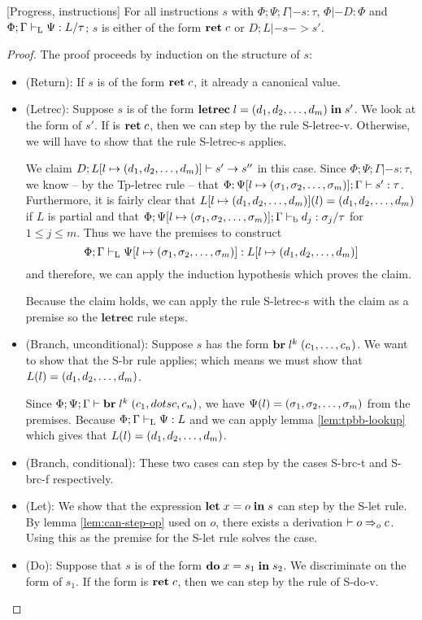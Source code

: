 \documentclass[a4paper, oneside, 10pt, draft]{memoir}
\begin{document}
\begin{lem}{[Progress, instructions]}
  \label{lem:progress-instructions}
  For all instructions $s$ with $\Phi;\Psi;\Gamma |- s : \tau$, $\Phi
  |- D : \Phi$ and $\Phi;\Gamma |-_{\mathrm{L}} \Psi : L / \tau$; $s$ is either
  of the form $\mathbf{ret} \; c$ or $D;L |- s -> s'$.
\end{lem}
\begin{proof}
  The proof proceeds by induction on the structure of $s$:
  \begin{itemize}
  \item (Return): If $s$ is of the form $\mathbf{ret} \; c$, it already a
    canonical value.
  \item (Letrec): Suppose $s$ is of the form
    $\mathbf{letrec} \; l = (d_1, d_2, \dotsc, d_m) \; \mathbf{in} \; s'$. We look at the form of $s'$. If is
    $\mathbf{ret} \; c$, then we can step by the rule S-letrec-v. Otherwise, we
    will have to show that the rule S-letrec-s applies.

    We claim $D;L[l \mapsto (d_1, d_2, \dotsc, d_m)] |- s' -> s''$ in this
    case. Since $\Phi;\Psi;\Gamma |- s : \tau$, we know -- by the
    Tp-letrec rule -- that $\Phi;\Psi[l \mapsto (\sigma_1, \sigma_2, \dotsc, \sigma_m)];\Gamma |- s'
    : \tau$. Furthermore, it is fairly clear that $L[l \mapsto
    (d_1, d_2, \dotsc, d_m)](l) = (d_1, d_2, \dotsc, d_m)$ if $L$ is partial and that $\Phi;\Psi[l
    \mapsto (\sigma_1, \sigma_2, \dotsc, \sigma_m)];\Gamma |-_{\mathrm{b}} d_j : \sigma_j / \tau$ for $1 \leq j
    \leq m$. Thus we have the premises to construct
    \begin{equation*}
      \Phi;\Gamma |-_{\mathrm{L}} \Psi[l \mapsto (\sigma_1, \sigma_2, \dotsc, \sigma_m)] : L[l \mapsto (d_1, d_2, \dotsc, d_m)]
    \end{equation*}
    and therefore, we can apply the induction hypothesis which proves the claim.

    Because the claim holds, we can apply the rule S-letrec-s with the
    claim as a premise so the $\mathbf{letrec}$ rule steps.
  \item (Branch, unconditional): Suppose $s$ has the form $\mathbf{br} \; l^k \; (c_1, \dotsc,
      c_n)$. We want to show that the S-br rule applies; which means
    we must show that $L(l) = (d_1, d_2, \dotsc, d_m)$.

    Since $\Phi;\Psi;\Gamma |- \mathbf{br} \; l^k \; (c_1, dotsc, c_n)$, we have
    $\Psi(l) = (\sigma_1, \sigma_2, \dotsc, \sigma_m)$ from the premises. Because $\Phi;\Gamma |-_{\mathrm{L}} \Psi : L$ and we can apply lemma
    \ref{lem:tpbb-lookup} which gives that $L(l) = (d_1, d_2, \dotsc, d_m)$.

  \item (Branch, conditional): These two cases can step by the cases
    S-brc-t and S-brc-f respectively.
  \item (Let): We show that the expression $\mathbf{let} \; x = o \; \mathbf{in} \; s$ can step
    by the S-let rule. By lemma \ref{lem:can-step-op} used on $o$,
    there exists a derivation $|- o =>_{o} c$. Using this as the premise
    for the S-let rule solves the case.
  \item (Do): Suppose that $s$ is of the form $\mathbf{do} \; x = s_1 \; \mathbf{in} \; s_2$. We
    discriminate on the form of $s_1$. If the form is $\mathbf{ret} \; c$, then
    we can step by the rule of S-do-v.


\end{itemize}
\end{proof}
\end{document}

